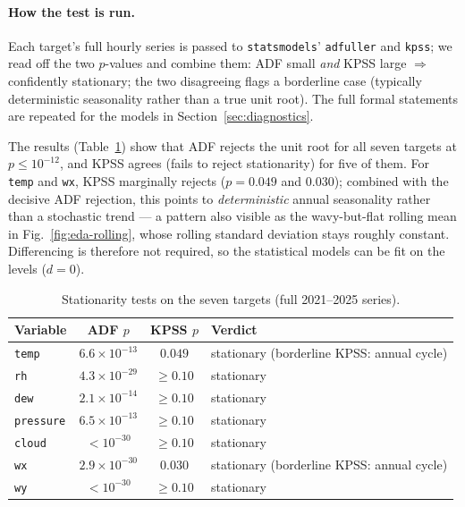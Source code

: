 \documentclass[12pt,a4paper,oneside]{report}
\begin{document}
\paragraph{How the test is run.}
Each target's full hourly series is passed to \texttt{statsmodels}'
\texttt{adfuller} and \texttt{kpss}; we read off the two $p$-values and combine
them: ADF small \emph{and} KPSS large $\Rightarrow$ confidently stationary; the
two disagreeing flags a borderline case (typically deterministic seasonality
rather than a true unit root). The full formal statements are repeated for the
models in Section~\ref{sec:diagnostics}.

The results (Table~\ref{tab:eda-adfkpss}) show that ADF rejects the unit root for all
seven targets at $p \le 10^{-12}$, and KPSS agrees (fails to reject stationarity) for
five of them. For \texttt{temp} and \texttt{wx}, KPSS marginally rejects
($p = 0.049$ and $0.030$); combined with the decisive ADF rejection, this points to
\emph{deterministic} annual seasonality rather than a stochastic trend --- a pattern
also visible as the wavy-but-flat rolling mean in Fig.~\ref{fig:eda-rolling}, whose
rolling standard deviation stays roughly constant. Differencing is therefore not
required, so the statistical models can be fit on the levels ($d=0$).

\begin{table}[H]\centering
\caption{Stationarity tests on the seven targets (full 2021--2025 series).}
\label{tab:eda-adfkpss}
\begin{tabular}{lccl}
\toprule
\textbf{Variable} & \textbf{ADF $p$} & \textbf{KPSS $p$} & \textbf{Verdict} \\
\midrule
\texttt{temp}     & $6.6\times10^{-13}$ & $0.049$      & stationary (borderline KPSS: annual cycle) \\
\texttt{rh}       & $4.3\times10^{-29}$ & $\ge 0.10$   & stationary \\
\texttt{dew}      & $2.1\times10^{-14}$ & $\ge 0.10$   & stationary \\
\texttt{pressure} & $6.5\times10^{-13}$ & $\ge 0.10$   & stationary \\
\texttt{cloud}    & $<10^{-30}$         & $\ge 0.10$   & stationary \\
\texttt{wx}       & $2.9\times10^{-30}$ & $0.030$      & stationary (borderline KPSS: annual cycle) \\
\texttt{wy}       & $<10^{-30}$         & $\ge 0.10$   & stationary \\
\bottomrule
\end{tabular}
\end{table}
\end{document}
